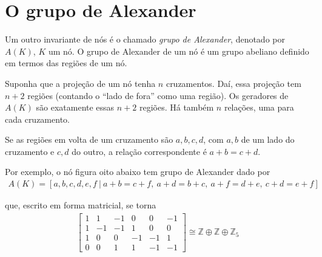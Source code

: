 	\section{O grupo de Alexander}
	\hspace{12pt} Um outro invariante de nós é o chamado \textit{grupo de Alexander}, denotado por $A(K)$, $K$ um nó. O grupo de Alexander de um nó é um grupo abeliano definido em termos das regiões de um nó.
	\par\vspace{0.3cm} Suponha que a projeção de um nó tenha $n$ cruzamentos. Daí, essa projeção tem $n+2$ regiões (contando o ``lado de fora'' como uma região). Os geradores de $A(K)$ são exatamente essas $n+2$ regiões. Há também $n$ relações, uma para cada cruzamento.
	\par\vspace{0.3cm} Se as regiões em volta de um cruzamento são $a,b,c,d$, com $a,b$ de um lado do cruzamento e $c,d$ do outro, a relação correspondente é $a+b=c+d$.
	\par\vspace{0.3cm} Por exemplo, o nó figura oito abaixo tem grupo de Alexander dado por 
	\begin{align*}
	A(K) = [a,b,c,d,e,f \ \vert \ a+b=c+f,\ a+d=b+c,\ a+f=d+e,\ c+d=e+f] 
	\end{align*}
	\par\vspace{0.3cm} que, escrito em forma matricial, se torna
	\begin{align*}
	\begin{bmatrix}
	1 & 1 & -1 & 0 & 0 & -1 \\
	1 & -1 & -1 & 1 & 0 & 0 \\
	1 & 0 & 0 & -1 & -1 & 1 \\
	0 & 0 & 1 & 1 & -1 & -1 
	\end{bmatrix}\cong\mathbb{Z}\oplus\mathbb{Z}\oplus\mathbb{Z}_5
	\end{align*}
	
